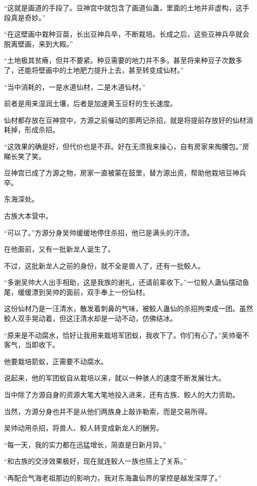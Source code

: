 \begin{this_body}
“这就是画道的手段了。豆神宫中就包含了画道仙蛊，里面的土地并非虚构，这手段真是奇妙。”

“在这壁画中栽种豆苗，长出豆神兵卒，不断栽培。长成之后，这些豆神兵卒就会脱离壁画，来到大殿。”

“土地极其贫瘠，但并不要紧。种豆需要的地力并不多，甚至将来种豆子次数多了，还能将壁画中的土地肥力提升上去，甚至转变成仙材。”

“当中消耗的，一是水道仙材，二是木道仙材。”

前者是用来湿润土壤，后者是加速黄玉豆籽的生长速度。

仙材都存放在豆神宫中，方源之前催动的那两记杀招，就是将提前存放好的仙材消耗掉，形成杀招。

“这效果的确是好，但代价也是不菲。好在无须我来操心，自有房家来掏腰包。”房睇长笑了笑。

豆神宫已成了方源之物，房家一直被蒙在鼓里，替方源出资，帮助他栽培豆神兵卒。

东海深处。

古族大本营中。

“可以了。”方源分身吴帅缓缓地停住杀招，他已是满头的汗渍。

在他面前，又有一批新龙人诞生了。

不过，这批新龙人之前的身份，就不全是兽人了，还有一批鲛人。

“多谢吴帅大人出手相助，这是我族的谢礼，还请前辈收下。”一位鲛人蛊仙摆动鱼尾，缓缓漂到吴帅的面前，双手奉上一份仙材。

这份仙材乃是一汪清水，散发着刺鼻的气味，被鲛人蛊仙的杀招拘束成一团。虽然鲛人双手晃动着，但这汪清水却是一动不动，仿佛结冰。

“原来是不动腐水，恰好让我用来栽培军团蚁，我收下了。你们有心了。”吴帅毫不客气，当即收下。

他要栽培箭蚁，正需要不动腐水。

说起来，他的军团蚁自从栽培以来，就以一种骇人的速度不断发展壮大。

当中除了方源自身的资源大笔大笔地投入进来，还有古族、鲛人的大力资助。

当然，方源分身也并不是从他们两族身上敲诈勒索，而是交易所得。

吴帅动用杀招，将兽人、鲛人转变成新龙人的酬劳。

“每一天，我的实力都在迅猛增长，简直是日新月异。”

“和古族的交涉效果极好，现在就连鲛人一族也搭上了关系。”

“再配合气海老祖那边的影响力，我对东海蛊仙界的掌控是越发深厚了。”


\end{this_body}
